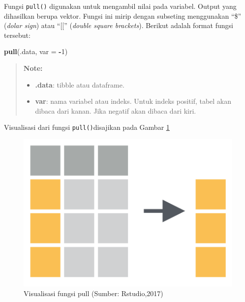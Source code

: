 \documentclass[]{book}
\newenvironment{Shaded}{\begin{snugshade}}{\end{snugshade}}
\newcommand{\KeywordTok}[1]{\textcolor[rgb]{0.13,0.29,0.53}{\textbf{#1}}}
\newcommand{\DataTypeTok}[1]{\textcolor[rgb]{0.13,0.29,0.53}{#1}}
\newcommand{\DecValTok}[1]{\textcolor[rgb]{0.00,0.00,0.81}{#1}}
\newcommand{\OperatorTok}[1]{\textcolor[rgb]{0.81,0.36,0.00}{\textbf{#1}}}
\newcommand{\NormalTok}[1]{#1}
\providecommand{\tightlist}{%
  \setlength{\itemsep}{0pt}\setlength{\parskip}{0pt}}
\begin{document}
Fungsi \texttt{pull()} digunakan untuk mengambil nilai pada variabel.
Output yang dihasilkan berupa vektor. Fungsi ini mirip dengan subseting
menggunakan ``\$'' (\emph{dolar sign}) atau ``{[}{[}'' (\emph{double
square brackets}). Berikut adalah format fungsi tersebut:

\begin{Shaded}
\begin{Highlighting}[]
\KeywordTok{pull}\NormalTok{(.data, }\DataTypeTok{var =} \OperatorTok{-}\DecValTok{1}\NormalTok{)}
\end{Highlighting}
\end{Shaded}

\begin{quote}
\textbf{Note: }

\begin{itemize}
\tightlist
\item
  \textbf{.data}: tibble atau dataframe.
\item
  \textbf{var}: nama variabel atau indeks. Untuk indeks positif, tabel
  akan dibaca dari kanan. Jika negatif akan dibaca dari kiri.
\end{itemize}
\end{quote}

Visualisasi dari fungsi \texttt{pull()}disajikan pada Gambar
\ref{fig:pull}

\begin{figure}

{\centering \includegraphics[width=6.17in]{pull} 

}

\caption{Visualisasi fungsi pull (Sumber: Rstudio,2017)}\label{fig:pull}
\end{figure}
\end{document}
